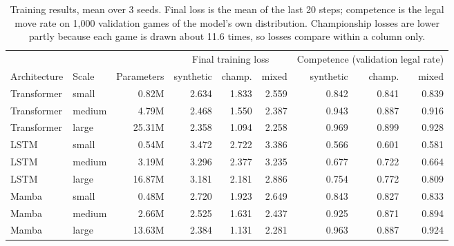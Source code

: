 \documentclass[journal]{IEEEtran}
\begin{document}
\begin{table}[t]
    \centering
    \caption{Training results, mean over 3 seeds. Final loss is the mean of the last 20 steps; competence is the legal
    move rate on 1,000 validation games of the model's own distribution. Championship losses are lower partly because
    each game is drawn about 11.6 times, so losses compare within a column only.}
    \label{tab:training}
    \footnotesize
    \begin{tabular}{llrrrrrrr}
    \toprule
    & & & \multicolumn{3}{c}{Final training loss} & \multicolumn{3}{c}{Competence (validation legal rate)} \\
    \cmidrule(lr){4-6}\cmidrule(lr){7-9}
    Architecture & Scale & Parameters & synthetic & champ. & mixed & synthetic & champ. & mixed \\
    \midrule
    Transformer & small  & 0.82M  & 2.634 & 1.833 & 2.559 & 0.842 & 0.841 & 0.839 \\
    Transformer & medium & 4.79M  & 2.468 & 1.550 & 2.387 & 0.943 & 0.887 & 0.916 \\
    Transformer & large  & 25.31M & 2.358 & 1.094 & 2.258 & 0.969 & 0.899 & 0.928 \\
    LSTM        & small  & 0.54M  & 3.472 & 2.722 & 3.386 & 0.566 & 0.601 & 0.581 \\
    LSTM        & medium & 3.19M  & 3.296 & 2.377 & 3.235 & 0.677 & 0.722 & 0.664 \\
    LSTM        & large  & 16.87M & 3.181 & 2.181 & 2.886 & 0.754 & 0.772 & 0.809 \\
    Mamba       & small  & 0.48M  & 2.720 & 1.923 & 2.649 & 0.843 & 0.827 & 0.833 \\
    Mamba       & medium & 2.66M  & 2.525 & 1.631 & 2.437 & 0.925 & 0.871 & 0.894 \\
    Mamba       & large  & 13.63M & 2.384 & 1.131 & 2.281 & 0.963 & 0.887 & 0.924 \\
    \bottomrule
    \end{tabular}
\end{table}
\end{document}

